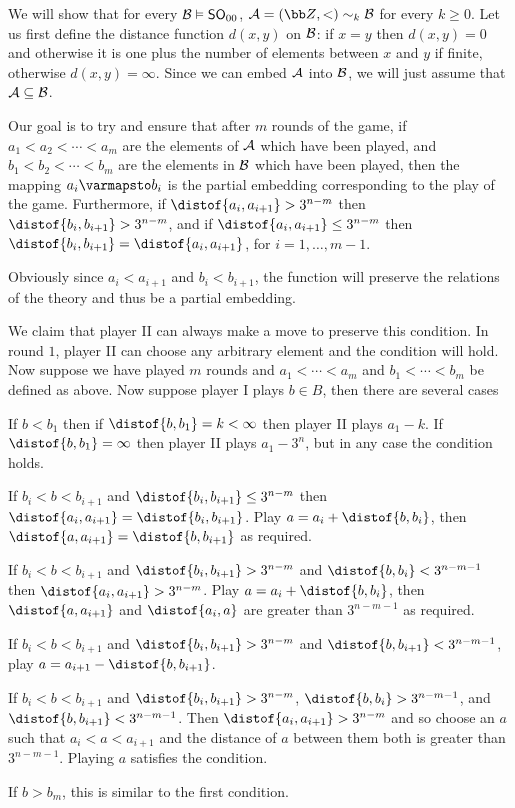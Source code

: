     We will show that for every ${\cal B}\vDash{\sf SO}_{00}$, ${\cal A}=({\bb Z},<)\sim_k{\cal B}$ for every $k\geq0$.
    Let us first define the distance function $d(x,y)$ on ${\cal B}$: if $x=y$ then $d(x,y)=0$ and otherwise it is one plus the number of elements between $x$ and $y$ if finite, otherwise $d(x,y)=\infty$.
    Since we can embed ${\cal A}$ into ${\cal B}$, we will just assume that ${\cal A}\subseteq{\cal B}$.

    Our goal is to try and ensure that after $m$ rounds of the game, if $a_1<a_2<\cdots<a_m$ are the elements of ${\cal A}$ which have been played, and $b_1<b_2<\cdots<b_m$ are the elements in ${\cal B}$
    which have been played, then the mapping $a_i\varmapsto b_i$ is the partial embedding corresponding to the play of the game.
    Furthermore, if $\distof{a_i,a_{i+1}}>3^{n-m}$ then $\distof{b_i,b_{i+1}}>3^{n-m}$, and if $\distof{a_i,a_{i+1}}\leq3^{n-m}$ then $\distof{b_i,b_{i+1}}=\distof{a_i,a_{i+1}}$, for $i=1,\dots,m-1$.

    Obviously since $a_i<a_{i+1}$ and $b_i<b_{i+1}$, the function will preserve the relations of the theory and thus be a partial embedding.

    We claim that player II can always make a move to preserve this condition.
    In round $1$, player II can choose any arbitrary element and the condition will hold.
    Now suppose we have played $m$ rounds and $a_1<\cdots<a_m$ and $b_1<\cdots<b_m$ be defined as above.
    Now suppose player I plays $b\in B$, then there are several cases
    \benum
        \item If $b<b_1$ then if $\distof{b,b_1}=k<\infty$ then player II plays $a_1-k$.
            If $\distof{b,b_1}=\infty$ then player II plays $a_1-3^n$, but in any case the condition holds.
        \item If $b_i<b<b_{i+1}$ and $\distof{b_i,b_{i+1}}\leq3^{n-m}$ then $\distof{a_i,a_{i+1}}=\distof{b_i,b_{i+1}}$.
            Play $a=a_i+\distof{b,b_i}$, then $\distof{a,a_{i+1}}=\distof{b,b_{i+1}}$ as required.
        \item If $b_i<b<b_{i+1}$ and $\distof{b_i,b_{i+1}}>3^{n-m}$ and $\distof{b,b_i}<3^{n-m-1}$ then $\distof{a_i,a_{i+1}}>3^{n-m}$.
            Play $a=a_i+\distof{b,b_i}$, then $\distof{a,a_{i+1}}$ and $\distof{a_i,a}$ are greater than $3^{n-m-1}$ as required.
        \item If $b_i<b<b_{i+1}$ and $\distof{b_i,b_{i+1}}>3^{n-m}$ and $\distof{b,b_{i+1}}<3^{n-m-1}$, play $a=a_{i+1}-\distof{b,b_{i+1}}$.
        \item If $b_i<b<b_{i+1}$ and $\distof{b_i,b_{i+1}}>3^{n-m}$, $\distof{b,b_i}>3^{n-m-1}$, and $\distof{b,b_{i+1}}<3^{n-m-1}$.
            Then $\distof{a_i,a_{i+1}}>3^{n-m}$ and so choose an $a$ such that $a_i<a<a_{i+1}$ and the distance of $a$ between them both is greater than $3^{n-m-1}$.
            Playing $a$ satisfies the condition.
        \item If $b>b_m$, this is similar to the first condition.
    \eenum

